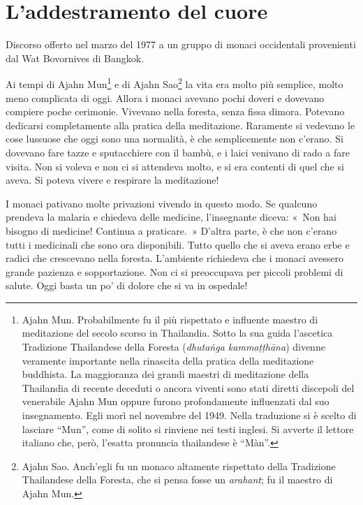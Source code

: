 \chapter{L'addestramento del cuore}

\begin{openingQuote}
  \centering

  Discorso offerto nel marzo del 1977 a un gruppo di monaci occidentali
  provenienti dal Wat Bovornives di Bangkok.
\end{openingQuote}

Ai tempi di Ajahn Mun\footnote{Ajahn Mun. Probabilmente fu il più
  rispettato e influente maestro di meditazione del secolo scorso in
  Thailandia. Sotto la sua guida l'ascetica Tradizione Thailandese della
  Foresta (\emph{dhutaṅga kammaṭṭhāna}) divenne veramente importante
  nella rinascita della pratica della meditazione buddhista. La
  maggioranza dei grandi maestri di meditazione della Thailandia di
  recente deceduti o ancora viventi sono stati diretti discepoli del
  venerabile Ajahn Mun oppure furono profondamente influenzati dal suo
  insegnamento. Egli morì nel novembre del 1949. Nella traduzione si è
  scelto di lasciare ``Mun'', come di solito si rinviene nei testi
  inglesi. Si avverte il lettore italiano che, però, l'esatta pronuncia
  thailandese è ``Màn''.} e di Ajahn Sao\footnote{Ajahn Sao. Anch'egli
  fu un monaco altamente rispettato della Tradizione Thailandese della
  Foresta, che si pensa fosse un \emph{arahant}; fu il maestro di Ajahn
  Mun.} la vita era molto più semplice, molto meno complicata di oggi.
Allora i monaci avevano pochi doveri e dovevano compiere poche
cerimonie. Vivevano nella foresta, senza fissa dimora. Potevano
dedicarsi completamente alla pratica della meditazione. Raramente si
vedevano le cose lussuose che oggi sono una normalità, è che
semplicemente non c'erano. Si dovevano fare tazze e sputacchiere con il
bambù, e i laici venivano di rado a fare visita. Non si voleva e non ci
si attendeva molto, e si era contenti di quel che si aveva. Si poteva
vivere e respirare la meditazione!

I monaci pativano molte privazioni vivendo in questo modo. Se qualcuno
prendeva la malaria e chiedeva delle medicine, l'insegnante diceva:
«~Non hai bisogno di medicine! Continua a praticare.~» D'altra parte, è
che non c'erano tutti i medicinali che sono ora disponibili. Tutto
quello che si aveva erano erbe e radici che crescevano nella foresta.
L'ambiente richiedeva che i monaci avessero grande pazienza e
sopportazione. Non ci si preoccupava per piccoli problemi di salute.
Oggi basta un po' di dolore che si va in ospedale!

